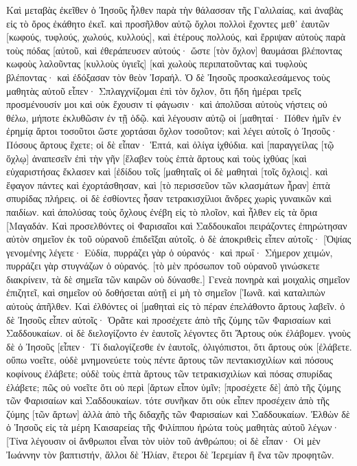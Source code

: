 Καὶ μεταβὰς ἐκεῖθεν ὁ Ἰησοῦς ἦλθεν παρὰ τὴν θάλασσαν τῆς Γαλιλαίας, καὶ ἀναβὰς εἰς τὸ ὄρος ἐκάθητο ἐκεῖ. 
καὶ προσῆλθον αὐτῷ ὄχλοι πολλοὶ ἔχοντες μεθ᾽ ἑαυτῶν [κωφούς, τυφλούς, χωλούς, κυλλούς], καὶ ἑτέρους πολλούς, καὶ ἔρριψαν αὐτοὺς παρὰ τοὺς πόδας [αὐτοῦ, καὶ ἐθεράπευσεν αὐτούς· 
ὥστε [τὸν ὄχλον] θαυμάσαι βλέποντας κωφοὺς λαλοῦντας [κυλλοὺς ὑγιεῖς] [καὶ χωλοὺς περιπατοῦντας καὶ τυφλοὺς βλέποντας· καὶ ἐδόξασαν τὸν θεὸν Ἰσραήλ. 
Ὁ δὲ Ἰησοῦς προσκαλεσάμενος τοὺς μαθητὰς αὐτοῦ εἶπεν· Σπλαγχνίζομαι ἐπὶ τὸν ὄχλον, ὅτι ἤδη ἡμέραι τρεῖς προσμένουσίν μοι καὶ οὐκ ἔχουσιν τί φάγωσιν· καὶ ἀπολῦσαι αὐτοὺς νήστεις οὐ θέλω, μήποτε ἐκλυθῶσιν ἐν τῇ ὁδῷ. 
καὶ λέγουσιν αὐτῷ οἱ [μαθηταί· Πόθεν ἡμῖν ἐν ἐρημίᾳ ἄρτοι τοσοῦτοι ὥστε χορτάσαι ὄχλον τοσοῦτον; 
καὶ λέγει αὐτοῖς ὁ Ἰησοῦς· Πόσους ἄρτους ἔχετε; οἱ δὲ εἶπαν· Ἑπτά, καὶ ὀλίγα ἰχθύδια. 
καὶ [παραγγείλας [τῷ ὄχλῳ] ἀναπεσεῖν ἐπὶ τὴν γῆν 
[ἔλαβεν τοὺς ἑπτὰ ἄρτους καὶ τοὺς ἰχθύας [καὶ εὐχαριστήσας ἔκλασεν καὶ [ἐδίδου τοῖς [μαθηταῖς οἱ δὲ μαθηταὶ [τοῖς ὄχλοις]. 
καὶ ἔφαγον πάντες καὶ ἐχορτάσθησαν, καὶ [τὸ περισσεῦον τῶν κλασμάτων ἦραν] ἑπτὰ σπυρίδας πλήρεις. 
οἱ δὲ ἐσθίοντες ἦσαν τετρακισχίλιοι ἄνδρες χωρὶς γυναικῶν καὶ παιδίων. 
καὶ ἀπολύσας τοὺς ὄχλους ἐνέβη εἰς τὸ πλοῖον, καὶ ἦλθεν εἰς τὰ ὅρια [Μαγαδάν. 
Καὶ προσελθόντες οἱ Φαρισαῖοι καὶ Σαδδουκαῖοι πειράζοντες ἐπηρώτησαν αὐτὸν σημεῖον ἐκ τοῦ οὐρανοῦ ἐπιδεῖξαι αὐτοῖς. 
ὁ δὲ ἀποκριθεὶς εἶπεν αὐτοῖς· [Ὀψίας γενομένης λέγετε· Εὐδία, πυρράζει γὰρ ὁ οὐρανός· 
καὶ πρωΐ· Σήμερον χειμών, πυρράζει γὰρ στυγνάζων ὁ οὐρανός. [τὸ μὲν πρόσωπον τοῦ οὐρανοῦ γινώσκετε διακρίνειν, τὰ δὲ σημεῖα τῶν καιρῶν οὐ δύνασθε.] 
Γενεὰ πονηρὰ καὶ μοιχαλὶς σημεῖον ἐπιζητεῖ, καὶ σημεῖον οὐ δοθήσεται αὐτῇ εἰ μὴ τὸ σημεῖον [Ἰωνᾶ. καὶ καταλιπὼν αὐτοὺς ἀπῆλθεν. 
Καὶ ἐλθόντες οἱ [μαθηταὶ εἰς τὸ πέραν ἐπελάθοντο ἄρτους λαβεῖν. 
ὁ δὲ Ἰησοῦς εἶπεν αὐτοῖς· Ὁρᾶτε καὶ προσέχετε ἀπὸ τῆς ζύμης τῶν Φαρισαίων καὶ Σαδδουκαίων. 
οἱ δὲ διελογίζοντο ἐν ἑαυτοῖς λέγοντες ὅτι Ἄρτους οὐκ ἐλάβομεν. 
γνοὺς δὲ ὁ Ἰησοῦς [εἶπεν· Τί διαλογίζεσθε ἐν ἑαυτοῖς, ὀλιγόπιστοι, ὅτι ἄρτους οὐκ [ἐλάβετε. 
οὔπω νοεῖτε, οὐδὲ μνημονεύετε τοὺς πέντε ἄρτους τῶν πεντακισχιλίων καὶ πόσους κοφίνους ἐλάβετε; 
οὐδὲ τοὺς ἑπτὰ ἄρτους τῶν τετρακισχιλίων καὶ πόσας σπυρίδας ἐλάβετε; 
πῶς οὐ νοεῖτε ὅτι οὐ περὶ [ἄρτων εἶπον ὑμῖν; [προσέχετε δὲ] ἀπὸ τῆς ζύμης τῶν Φαρισαίων καὶ Σαδδουκαίων. 
τότε συνῆκαν ὅτι οὐκ εἶπεν προσέχειν ἀπὸ τῆς ζύμης [τῶν ἄρτων] ἀλλὰ ἀπὸ τῆς διδαχῆς τῶν Φαρισαίων καὶ Σαδδουκαίων. 
Ἐλθὼν δὲ ὁ Ἰησοῦς εἰς τὰ μέρη Καισαρείας τῆς Φιλίππου ἠρώτα τοὺς μαθητὰς αὐτοῦ λέγων· [Τίνα λέγουσιν οἱ ἄνθρωποι εἶναι τὸν υἱὸν τοῦ ἀνθρώπου; 
οἱ δὲ εἶπαν· Οἱ μὲν Ἰωάννην τὸν βαπτιστήν, ἄλλοι δὲ Ἠλίαν, ἕτεροι δὲ Ἰερεμίαν ἢ ἕνα τῶν προφητῶν. 
